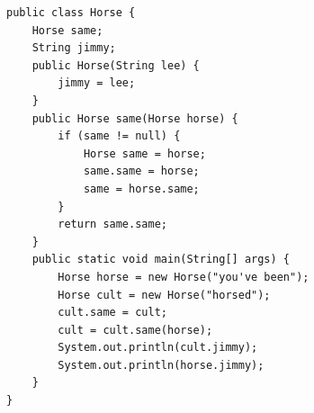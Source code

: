 \question
\begin{lstlisting}
public class Horse {                          
    Horse same;                             
    String jimmy;                
    public Horse(String lee) {
        jimmy = lee;
    }
    public Horse same(Horse horse) {
        if (same != null) {
            Horse same = horse;
            same.same = horse;
            same = horse.same;
        }
        return same.same;
    }
    public static void main(String[] args) {
        Horse horse = new Horse("you've been");
        Horse cult = new Horse("horsed");
        cult.same = cult;
        cult = cult.same(horse);
        System.out.println(cult.jimmy);
        System.out.println(horse.jimmy);
    }
}
\end{lstlisting}

